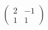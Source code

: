 \documentclass[preview]{standalone}
\begin{document}
\begin{align*}
\begin{pmatrix}2 & -1 \\ 1 & 1\end{pmatrix}
\end{align*}
\end{document}
